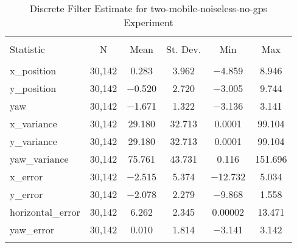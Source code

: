 
\begin{table}[h] \centering 
  \caption{Discrete Filter Estimate for two-mobile-noiseless-no-gps Experiment} 
  \label{tab:two_mobile_noiseless_no_gps_discrete_summary} 
\begin{tabular}{@{\extracolsep{5pt}}lccccc} 
\\[-1.8ex]\hline 
\hline \\[-1.8ex] 
Statistic & \multicolumn{1}{c}{N} & \multicolumn{1}{c}{Mean} & \multicolumn{1}{c}{St. Dev.} & \multicolumn{1}{c}{Min} & \multicolumn{1}{c}{Max} \\ 
\hline \\[-1.8ex] 
x\_position & 30,142 & 0.283 & 3.962 & $-$4.859 & 8.946 \\ 
y\_position & 30,142 & $-$0.520 & 2.720 & $-$3.005 & 9.744 \\ 
yaw & 30,142 & $-$1.671 & 1.322 & $-$3.136 & 3.141 \\ 
x\_variance & 30,142 & 29.180 & 32.713 & 0.0001 & 99.104 \\ 
y\_variance & 30,142 & 29.180 & 32.713 & 0.0001 & 99.104 \\ 
yaw\_variance & 30,142 & 75.761 & 43.731 & 0.116 & 151.696 \\ 
x\_error & 30,142 & $-$2.515 & 5.374 & $-$12.732 & 5.034 \\ 
y\_error & 30,142 & $-$2.078 & 2.279 & $-$9.868 & 1.558 \\ 
horizontal\_error & 30,142 & 6.262 & 2.345 & 0.00002 & 13.471 \\ 
yaw\_error & 30,142 & 0.010 & 1.814 & $-$3.141 & 3.142 \\ 
\hline \\[-1.8ex] 
\end{tabular} 
\end{table} 

